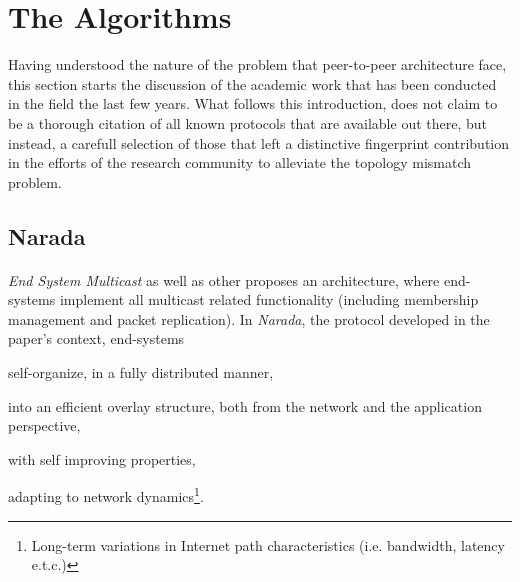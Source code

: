 \documentclass[a4paper,10pt]{article}
\begin{document}
\section{The Algorithms}
Having understood the nature of the problem that peer-to-peer architecture face, this section starts the discussion of the academic work that has been conducted in the field the last few years. What follows this introduction, does not claim to be a thorough citation of all known protocols that are available out there, but instead, a carefull selection of those that left a distinctive fingerprint contribution in the efforts of the research community to alleviate the topology mismatch problem.


\subsection{Narada}

\paragraph*{}
\emph{End System Multicast} \cite{chu_esm_2000, chu_esm_2001, chu_esm_2002} as well as other  proposes an architecture, where end-systems implement all multicast related functionality (including membership management and packet replication). In \emph{Narada}, the protocol developed in the paper's context, end-systems
\begin{inparaenum}
  \item self-organize, in a fully distributed manner,
  \item into an efficient overlay structure, both from the network and the application perspective,
  \item with self improving properties,
  \item adapting to network dynamics\footnote{Long-term variations in Internet path characteristics (i.e. bandwidth, latency e.t.c.)}.
\end{inparaenum}
\end{document}
